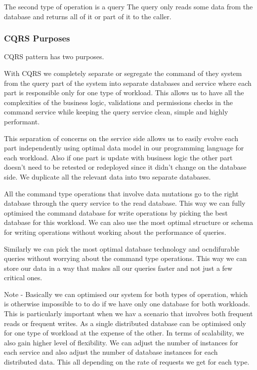 The second type of operation is a query
The query only reads some data from the database and returns all of it or part of it to the caller.

\subsubsection{CQRS Purposes}
CQRS pattern has two purposes.

With CQRS we completely separate or segregate the command of they system from the query part of the system into separate databases and service where each part is responsible only for one type of workload.
This allows us to have all the complexities of the business logic, validations and permissions checks in the command service while keeping the query service clean, simple and highly performant.

This separation of concerns on the service side allows us to easily evolve each part independently using optimal data model in our programming language for each workload.
Also if one part is update with business logic the other part doesn't need to be retested or redeployed since it didn't change on the database side.
We duplicate all the relevant data into two separate databases.

All the command type operations that involve data mutations go to the right database through the query service to the read database.
This way we can fully optimised the command database for write operations by picking the best database for this workload.
We can also use the most optimal structure or schema for writing operations without working about the performance of queries.

Similarly we can pick the most optimal database technology and ocndifurable queries without worrying about the command type operations.
This way we can store our data in a way that makes all our queries faster and not just a few critical ones.

Note - Basically we can optimised our system for both types of operation, which is otherwise impossible to to do if we have only one database for both workloads.
This is particularly important when we hav a scenario that involves both frequent reads or frequent writes.
As a single distributed database can be optimised only for one type of workload at the expense of the other.
In terms of scalability, we also gain higher level of flexibility.
We can adjust the number of instances for each service and also adjust the number of database instances for each distributed data.
This all depending on the rate of requests we get for each type.

